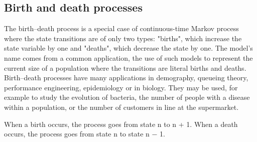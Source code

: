 \subsection*{Birth and death processes}

The birth–death process is a special case of continuous-time Markov process where the state transitions are of only two types: "births", which increase the state variable by one and "deaths", which decrease the state by one. The model's name comes from a common application, the use of such models to represent the current size of a population where the transitions are literal births and deaths. Birth–death processes have many applications in demography, queueing theory, performance engineering, epidemiology or in biology. They may be used, for example to study the evolution of bacteria, the number of people with a disease within a population, or the number of customers in line at the supermarket.
 
When a birth occurs, the process goes from state n to n + 1. When a death occurs, the process goes from state n to state n − 1. 

